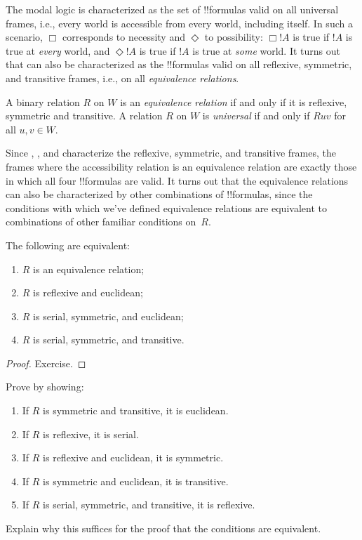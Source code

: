 \documentclass[../../../include/open-logic-section]{subfiles}
\begin{document}


The modal logic  is characterized as the set of !!{formula}s
valid on all universal frames, i.e., every world is accessible from
every world, including itself. In such a scenario, $\Box$ corresponds
to necessity and $\Diamond$ to possibility: $\Box !A$ is true if $!A$
is true at \emph{every} world, and $\Diamond !A$ is true if $!A$ is
true at \emph{some} world. It turns out that  can also be
characterized as the !!{formula}s valid on all reflexive, symmetric,
and transitive frames, i.e., on all \emph{equivalence relations}.

\begin{defn}
  A binary relation $R$ on $W$ is an \emph{equivalence relation} if
  and only if it is reflexive, symmetric and transitive.  A relation
  $R$ on $W$ is \emph{universal} if and only if $Ruv$ for all $u,v \in
  W$.
\end{defn}

Since , , and  characterize the reflexive,
symmetric, and transitive frames, the frames where the accessibility
relation is an equivalence relation are exactly those in which all
four !!{formula}s are valid. It turns out that the equivalence
relations can also be characterized by other combinations of
!!{formula}s, since the conditions with which we've defined
equivalence relations are equivalent to combinations of other familiar
conditions on~$R$.

\begin{prop}
  The following are equivalent:
  \begin{enumerate}
  \item $R$ is an equivalence relation;
  \item $R$ is reflexive and euclidean;
  \item $R$ is serial, symmetric, and euclidean;
  \item $R$ is serial, symmetric, and transitive.
  \end{enumerate}
\end{prop}

\begin{proof}
  Exercise.
\end{proof}

\begin{prob}
  Prove  by showing:
  \begin{enumerate}
  \item If $R$ is symmetric and transitive, it is euclidean.
  \item If $R$ is reflexive, it is serial.
  \item If $R$ is reflexive and euclidean, it is symmetric.
  \item If $R$ is symmetric and euclidean, it is transitive.
  \item If $R$ is serial, symmetric, and transitive, it is reflexive.
  \end{enumerate}
  Explain why this suffices for the proof that the conditions are
  equivalent.
\end{prob}
\end{document}
